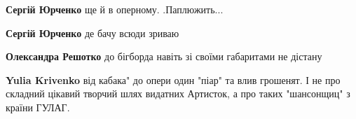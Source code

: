 \begin{itemize}
\begin{itemize}
\textbf{Сергій Юрченко} ще й в оперному. .Паплюжить...

 
\textbf{Сергій Юрченко} де бачу всюди зриваю

 
\textbf{Олександра Решотко} до бігборда навіть зі своїми габаритами не дістану 🤷🏻‍♂️😄

 
\textbf{Yulia Krivenko} від кабака" до опери один "піар" та влив грошенят.
І не про складний цікавий творчий шлях видатних Артисток, а про таких "шансонщиц" з країни ГУЛАГ.
\end{itemize}
 


\end{itemize}

